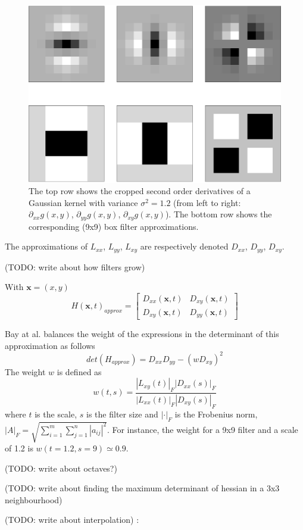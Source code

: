 \begin{figure}
    \centering
    \includegraphics[height=0.3\textheight]{img/gaussian-kernel-derivatives}
    \caption{
        The top row shows the cropped second order derivatives of a Gaussian kernel with variance $\sigma^2=1.2$ (from left to right:
        $\partial_{xx} g(x,y)$, $\partial_{yy} g(x,y)$, $\partial_{xy} g(x,y)$).
        The bottom row shows the corresponding (9x9) box filter approximations.
        \label{fig:gaussian_derivatives}
    }
\end{figure}

The approximations of $L_{xx}$, $L_{yy}$, $L_{xy}$ are respectively denoted $D_{xx}$, $D_{yy}$, $D_{xy}$.



(TODO: write about how filters grow)

With $\mathbf{x} = (x,y)$
\begin{equation}
    H(\mathbf{x},t)_{approx} = 
    \begin{bmatrix}
        D_{xx}(\mathbf{x},t) & D_{xy}(\mathbf{x},t) \\
        D_{xy}(\mathbf{x},t) & D_{yy}(\mathbf{x},t)
    \end{bmatrix}
\end{equation}

Bay at al. balances the weight of the expressions in the determinant of this approximation as follows
\begin{equation}
    det(H_{approx}) = D_{xx} D_{yy} - (w D_{xy})^2
\end{equation}
The weight $w$ is defined as 
\begin{equation}
w(t,s) = \frac{\left|L_{xy}(t)\right|_F \left|D_{xx}(s)\right|_F}{\left|L_{xx}(t)\right|_F \left|D_{xy}(s)\right|_F}
\end{equation}
where $t$ is the scale, $s$ is the filter size and $\left|\cdot\right|_F$ is the Frobenius norm, $\left|A\right|_F=\sqrt{\sum_{i=1}^m\sum_{j=1}^n |a_{ij}|^2}$.
For instance, the weight for a 9x9 filter and a scale of 1.2 is $w(t=1.2, s=9) \simeq 0.9$.

(TODO: write about octaves?)

(TODO: write about finding the maximum determinant of hessian in a 3x3 neighbourhood)

(TODO: write about interpolation)
\cite{Brown02invariantfeatures}:

\begin{equation}
\end{equation}

